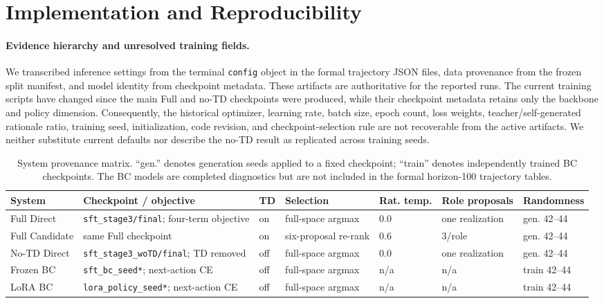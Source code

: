 \documentclass[manuscript,review,anonymous]{acmart}
\begin{document}
\section{Implementation and Reproducibility}
\label{sec:reproducibility}

\paragraph{Evidence hierarchy and unresolved training fields.}
We transcribed inference settings from the terminal \texttt{config} object in
the formal trajectory JSON files, data provenance from the frozen split
manifest, and model identity from checkpoint metadata. These artifacts are
authoritative for the reported runs. The current training scripts have changed
since the main Full and no-TD checkpoints were produced, while their checkpoint
metadata retains only the backbone and policy dimension. Consequently, the
historical optimizer, learning rate, batch size, epoch count, loss weights,
teacher/self-generated rationale ratio, training seed, initialization, code
revision, and checkpoint-selection rule are not recoverable from the active
artifacts. We neither substitute current defaults nor describe the no-TD result
as replicated across training seeds.

\begin{table}[t]
\centering
\small
\setlength{\tabcolsep}{3.5pt}
\begin{tabularx}{\textwidth}{@{}l>{\raggedright\arraybackslash}Xlllll@{}}
\toprule
System & Checkpoint / objective & TD & Selection & Rat. temp. & Role proposals & Randomness \\
\midrule
Full Direct & \texttt{sft\_stage3/final}; four-term objective & on & full-space argmax & 0.0 & one realization & gen. 42--44 \\
Full Candidate & same Full checkpoint & on & six-proposal re-rank & 0.6 & 3/role & gen. 42--44 \\
No-TD Direct & \texttt{sft\_stage3\_woTD/final}; TD removed & off & full-space argmax & 0.0 & one realization & gen. 42--44 \\
Frozen BC & \texttt{sft\_bc\_seed*}; next-action CE & off & full-space argmax & n/a & n/a & train 42--44 \\
LoRA BC & \texttt{lora\_policy\_seed*}; next-action CE & off & full-space argmax & n/a & n/a & train 42--44 \\
\bottomrule
\end{tabularx}
\caption{System provenance matrix. ``gen.'' denotes generation seeds applied to
a fixed checkpoint; ``train'' denotes independently trained BC checkpoints.
The BC models are completed diagnostics but are not included in the formal
horizon-100 trajectory tables.}
\label{tab:system-provenance}
\end{table}
\end{document}
